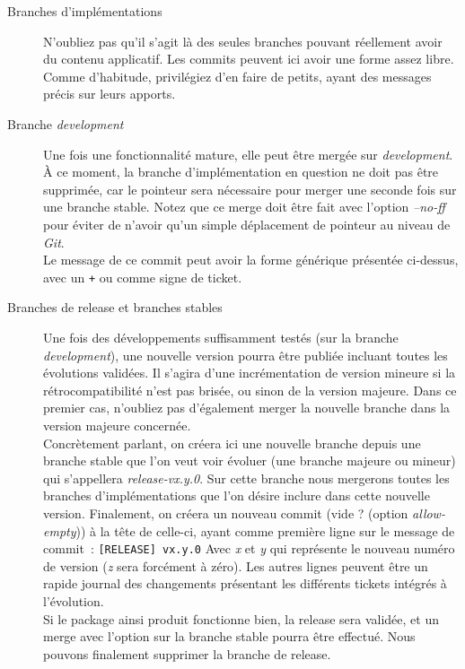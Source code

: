 \begin{description}
	\item[Branches d'implémentations]
		N'oubliez pas qu'il s'agit là des seules branches pouvant réellement avoir du contenu applicatif.
		Les commits peuvent ici avoir une forme assez libre. Comme d'habitude, privilégiez d'en faire de petits, ayant des messages précis sur leurs apports. \item[Branche \emph{development}]
		Une fois une fonctionnalité mature, elle peut être mergée sur \emph{development}.
		À ce moment, la branche d'implémentation en question ne doit pas être supprimée, car le pointeur sera nécessaire pour merger une seconde fois sur une branche stable.
		Notez que ce merge doit être fait avec l'option \emph{--no-ff} pour éviter de n'avoir qu'un simple déplacement de pointeur au niveau de \emph{Git}.\\

		Le message de ce commit peut avoir la forme générique présentée ci-dessus, avec un {\tt+} ou {\tt*} comme signe de ticket.
	\item[Branches de release et branches stables] 
		Une fois des développements suffisamment testés (sur la branche \emph{development}), une nouvelle version pourra être publiée incluant toutes les évolutions validées.
		Il s'agira d'une incrémentation de version mineure si la rétrocompatibilité n'est pas brisée, ou sinon de la version majeure.
		Dans ce premier cas, n'oubliez pas d'également merger la nouvelle branche dans la version majeure concernée.\\

		Concrètement parlant, on créera ici une nouvelle branche depuis une branche stable que l'on veut voir évoluer (une branche majeure ou mineur) qui s'appellera \emph{release-vx.y.0}.
		Sur cette branche nous mergerons toutes les branches d'implémentations que l'on désire inclure dans cette nouvelle version.
		Finalement, on créera un nouveau commit (vide ? (option \emph{allow-empty})) à la tête de celle-ci, ayant comme première ligne sur le message de commit~:
		{\tt[RELEASE] vx.y.0}
		Avec \emph{x} et \emph{y} qui représente le nouveau numéro de version (\emph{z} sera forcément à zéro).
		Les autres lignes peuvent être un rapide journal des changements présentant les différents tickets intégrés à l'évolution.\\
		Si le package ainsi produit fonctionne bien, la release sera validée, et un merge avec l'option  sur la branche stable pourra être effectué.
		Nous pouvons finalement supprimer la branche de release.


\end{description}
